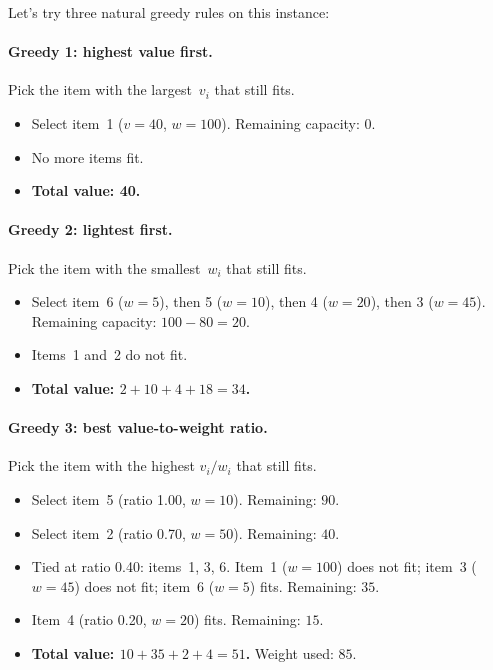 \noindent
Let's try three natural greedy rules on this instance:

\paragraph{Greedy 1: highest value first.}
Pick the item with the largest~$v_i$ that still fits.
\begin{itemize}[nosep]
  \item Select item~1 ($v = 40$, $w = 100$).
        Remaining capacity: $0$.
  \item No more items fit.
  \item \textbf{Total value: 40.}
\end{itemize}

\paragraph{Greedy 2: lightest first.}
Pick the item with the smallest~$w_i$ that still fits.
\begin{itemize}[nosep]
  \item Select item~6 ($w = 5$), then 5 ($w = 10$),
        then 4 ($w = 20$), then 3 ($w = 45$).
        Remaining capacity: $100 - 80 = 20$.
  \item Items~1 and~2 do not fit.
  \item \textbf{Total value: $2 + 10 + 4 + 18 = 34$.}
\end{itemize}

\paragraph{Greedy 3: best value-to-weight ratio.}
Pick the item with the highest $v_i / w_i$ that still fits.%
\begin{itemize}[nosep]
  \item Select item~5 (ratio 1.00, $w = 10$).
        Remaining: $90$.
  \item Select item~2 (ratio 0.70, $w = 50$).
        Remaining: $40$.
  \item Tied at ratio 0.40: items~1, 3, 6.
        Item~1 ($w = 100$) does not fit;
        item~3 ($w = 45$) does not fit;
        item~6 ($w = 5$) fits.  Remaining: $35$.
  \item Item~4 (ratio 0.20, $w = 20$) fits.  Remaining: $15$.
  \item \textbf{Total value: $10 + 35 + 2 + 4 = 51$.}
        Weight used: $85$.
\end{itemize}

